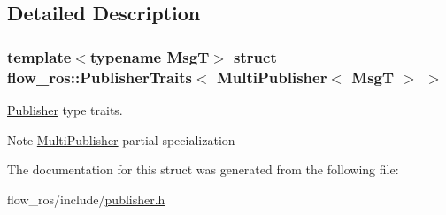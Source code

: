 \subsection{Detailed Description}
\subsubsection*{template$<$typename MsgT$>$\newline
struct flow\+\_\+ros\+::\+Publisher\+Traits$<$ Multi\+Publisher$<$ Msg\+T $>$ $>$}

\hyperlink{classflow__ros_1_1_publisher}{Publisher} type traits. 

\begin{DoxyNote}{Note}
\hyperlink{classflow__ros_1_1_multi_publisher}{Multi\+Publisher} partial specialization 
\end{DoxyNote}


The documentation for this struct was generated from the following file\+:\begin{DoxyCompactItemize}
\item 
flow\+\_\+ros/include/\hyperlink{publisher_8h}{publisher.\+h}\end{DoxyCompactItemize}
